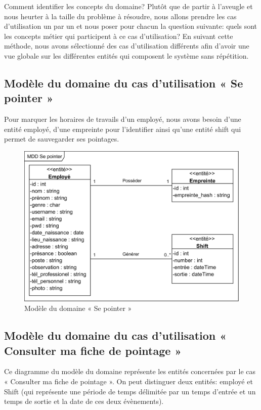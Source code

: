 Comment identifier les concepts du domaine? Plutôt que de partir à l’aveugle 
et nous heurter à la taille du problème à résoudre, nous allons prendre les cas 
d’utilisation un par un et nous poser pour chacun la question suivante: quels 
sont les concepts métier qui participent à ce cas d’utilisation? En suivant 
cette méthode, nous avons sélectionné des cas d’utilisation différents afin 
d’avoir une vue globale sur les différentes entités qui composent le système 
sans répétition.

\subsection*{Modèle du domaine du cas d'utilisation « Se pointer »}
Pour marquer les horaires de travails d’un employé, nous avons besoin d’une 
entité employé, d'une empreinte pour l’identifier ainsi qu’une entité shift qui 
permet de sauvegarder ses pointages. 

\begin{figure}[h!]
    \centering
    \includegraphics[scale=1.3]{images/MDD/MDD Se pointer.png}
    \caption{Modèle du domaine « Se pointer »}
    \label{fig12}
\end{figure}


\subsection*{Modèle du domaine du cas d'utilisation « Consulter ma fiche de pointage »}
Ce diagramme du modèle du domaine représente les entités concernées par le cas 
« Consulter ma fiche de pointage ». On peut distinguer deux entités: employé 
et Shift (qui représente une période de temps délimitée par un temps d’entrée et 
un temps de sortie et la date de ces deux évènements).

